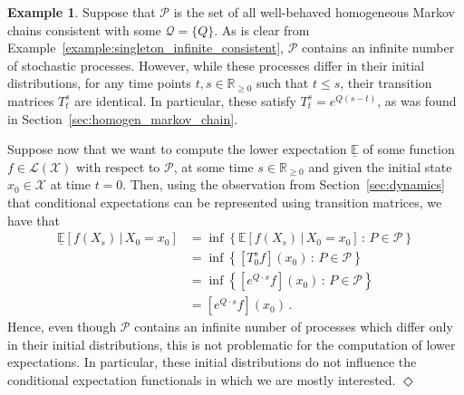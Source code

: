 \documentclass[10pt,a4paper]{paper}
\theoremstyle{definition}
\newtheorem{exmp}{Example}%
\newcommand{\reals}{\mathbb{R}}
\newcommand{\realsnonneg}{\reals_{\geq 0}}
\newcommand{\states}{\mathcal{X}}
\newcommand{\gambles}{\mathcal{L}}
\newcommand{\gamblesX}{\gambles(\states)}
\newcommand{\rateset}{\mathcal{Q}}
\newcommand{\exampleend}{\hfill$\Diamond$}
\begin{document}

\begin{exmp}
Suppose that $\mathcal{P}$ is the set of all well-behaved homogeneous Markov chains consistent with some $\rateset=\{Q\}$. As is clear from Example~\ref{example:singleton_infinite_consistent}, $\mathcal{P}$ contains an infinite number of stochastic processes. However, while these processes differ in their initial distributions, for any time points $t,s\in\realsnonneg$ such that $t\leq s$, their transition matrices $T_t^s$ are identical. In particular, these satisfy $T_t^s=e^{Q(s-t)}$, as was found in Section~\ref{sec:homogen_markov_chain}.

Suppose now that we want to compute the lower expectation $\underline{\mathbb{E}}$ of some function $f\in\gamblesX$ with respect to $\mathcal{P}$, at some time $s\in\realsnonneg$ and given the initial state $x_0\in\states$ at time $t=0$. Then, using the observation from Section~\ref{sec:dynamics} that conditional expectations can be represented using transition matrices, we have that
\begin{align*}
\underline{\mathbb{E}}[f(X_s)\,\vert\,X_{0}=x_0] &= \inf\left\{\mathbb{E}[f(X_s)\,\vert\,X_{0}=x_0]\,:\,P\in\mathcal{P}\right\} \\
 &= \inf\left\{ [T_0^sf](x_0) \,:\,P\in\mathcal{P}\right\} \\
 &= \inf\left\{ [e^{Q\cdot s}f](x_0)\,:\,P\in\mathcal{P}\right\} \\
 &= [e^{Q\cdot s}f](x_0)\,.
\end{align*}
Hence, even though $\mathcal{P}$ contains an infinite number of processes which differ only in their initial distributions, this is not problematic for the computation of lower expectations. In particular, these initial distributions do not influence the conditional expectation functionals in which we are mostly interested.
\exampleend
\end{exmp}

\end{document}
